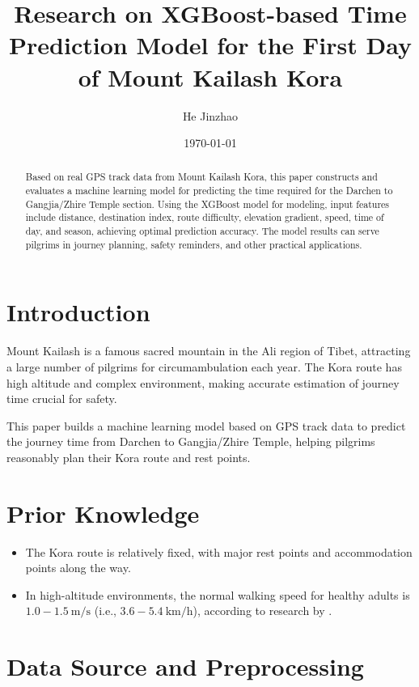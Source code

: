 \documentclass[12pt]{article}
\title{Research on XGBoost-based Time Prediction Model for the First Day of Mount Kailash Kora}
\author{He Jinzhao}
\date{\today}
\begin{document}
\maketitle

\begin{abstract}
Based on real GPS track data from Mount Kailash Kora, this paper constructs and evaluates a machine learning model for predicting the time required for the Darchen to Gangjia/Zhire Temple section. Using the XGBoost model for modeling, input features include distance, destination index, route difficulty, elevation gradient, speed, time of day, and season, achieving optimal prediction accuracy. The model results can serve pilgrims in journey planning, safety reminders, and other practical applications.
\end{abstract}

\section{Introduction}

Mount Kailash is a famous sacred mountain in the Ali region of Tibet, attracting a large number of pilgrims for circumambulation each year. The Kora route has high altitude and complex environment, making accurate estimation of journey time crucial for safety.

This paper builds a machine learning model based on GPS track data to predict the journey time from Darchen to Gangjia/Zhire Temple, helping pilgrims reasonably plan their Kora route and rest points.

\section{Prior Knowledge}

\begin{itemize}
  \item The Kora route is relatively fixed, with major rest points and accommodation points along the way.
  \item In high-altitude environments, the normal walking speed for healthy adults is $1.0 - 1.5 \ \mathrm{m/s}$ (i.e., $3.6 - 5.4 \ \mathrm{km/h}$), according to research by \cite{Horiuchi2016, Ainslie2005}.
\end{itemize}


\section{Data Source and Preprocessing}
\end{document}
